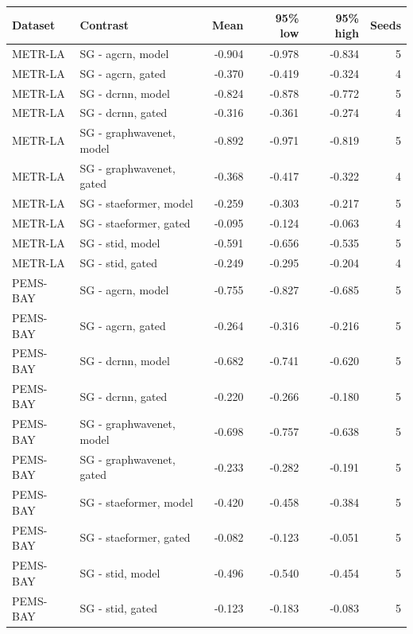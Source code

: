 \begin{tabular}{llrrrr}
\toprule
Dataset & Contrast & Mean & 95\% low & 95\% high & Seeds \\
\midrule
METR-LA & SG - agcrn, model & -0.904 & -0.978 & -0.834 & 5 \\
METR-LA & SG - agcrn, gated & -0.370 & -0.419 & -0.324 & 4 \\
METR-LA & SG - dcrnn, model & -0.824 & -0.878 & -0.772 & 5 \\
METR-LA & SG - dcrnn, gated & -0.316 & -0.361 & -0.274 & 4 \\
METR-LA & SG - graphwavenet, model & -0.892 & -0.971 & -0.819 & 5 \\
METR-LA & SG - graphwavenet, gated & -0.368 & -0.417 & -0.322 & 4 \\
METR-LA & SG - staeformer, model & -0.259 & -0.303 & -0.217 & 5 \\
METR-LA & SG - staeformer, gated & -0.095 & -0.124 & -0.063 & 4 \\
METR-LA & SG - stid, model & -0.591 & -0.656 & -0.535 & 5 \\
METR-LA & SG - stid, gated & -0.249 & -0.295 & -0.204 & 4 \\
PEMS-BAY & SG - agcrn, model & -0.755 & -0.827 & -0.685 & 5 \\
PEMS-BAY & SG - agcrn, gated & -0.264 & -0.316 & -0.216 & 5 \\
PEMS-BAY & SG - dcrnn, model & -0.682 & -0.741 & -0.620 & 5 \\
PEMS-BAY & SG - dcrnn, gated & -0.220 & -0.266 & -0.180 & 5 \\
PEMS-BAY & SG - graphwavenet, model & -0.698 & -0.757 & -0.638 & 5 \\
PEMS-BAY & SG - graphwavenet, gated & -0.233 & -0.282 & -0.191 & 5 \\
PEMS-BAY & SG - staeformer, model & -0.420 & -0.458 & -0.384 & 5 \\
PEMS-BAY & SG - staeformer, gated & -0.082 & -0.123 & -0.051 & 5 \\
PEMS-BAY & SG - stid, model & -0.496 & -0.540 & -0.454 & 5 \\
PEMS-BAY & SG - stid, gated & -0.123 & -0.183 & -0.083 & 5 \\
\bottomrule
\end{tabular}
